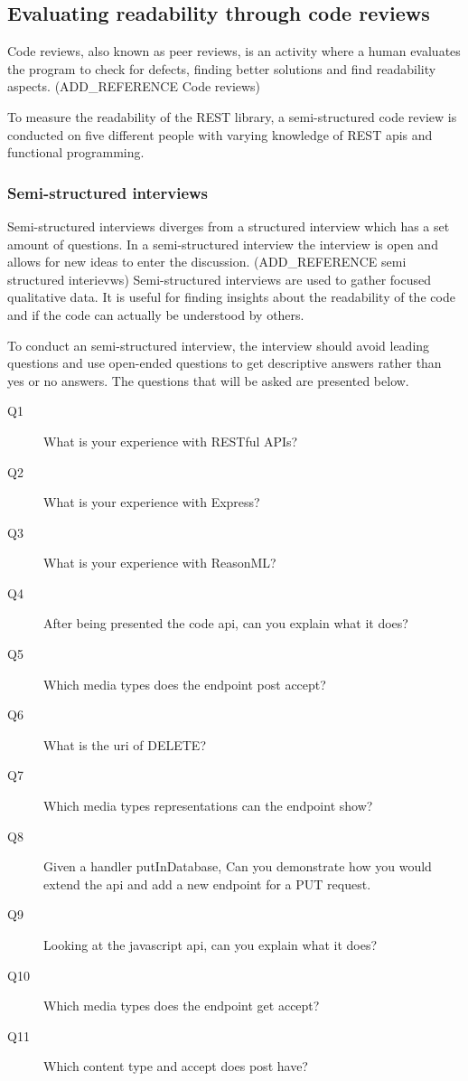 \subsection{Evaluating readability through code reviews}

Code reviews, also known as peer reviews, is an activity where a human evaluates
the program to check for defects, finding better solutions and find readability
aspects. (ADD\_REFERENCE Code reviews)

To measure the readability of the REST library, a semi-structured code review is
conducted on five different people with varying knowledge of REST apis and
functional programming.

\subsubsection{Semi-structured interviews}

Semi-structured interviews diverges from a structured interview which has a set
amount of questions. In a semi-structured interview the interview is open and
allows for new ideas to enter the discussion. (ADD\_REFERENCE semi structured
interievws) Semi-structured interviews are used to gather focused qualitative
data. It is useful for finding insights about the readability of the code and if
the code can actually be understood by others.

To conduct an semi-structured interview, the interview should avoid leading
questions and use open-ended questions to get descriptive answers rather than
yes or no answers. The questions that will be asked are presented below.

\begin{description}
    \item[Q1] What is your experience with RESTful APIs?
    \item[Q2] What is your experience with Express?
    \item[Q3] What is your experience with ReasonML?
    \item[Q4] After being presented the code api, can you explain what it does?
    \item[Q5] Which media types does the endpoint post accept?
    \item[Q6] What is the uri of DELETE?
    \item[Q7] Which media types representations can the endpoint show?
    \item[Q8] Given a handler putInDatabase, Can you demonstrate how you would
        extend the api and add a new endpoint for a PUT request.
    \item[Q9] Looking at the javascript api, can you explain what it does?
    \item[Q10] Which media types does the endpoint get accept?
    \item[Q11] Which content type and accept does post have?
\end{description}

